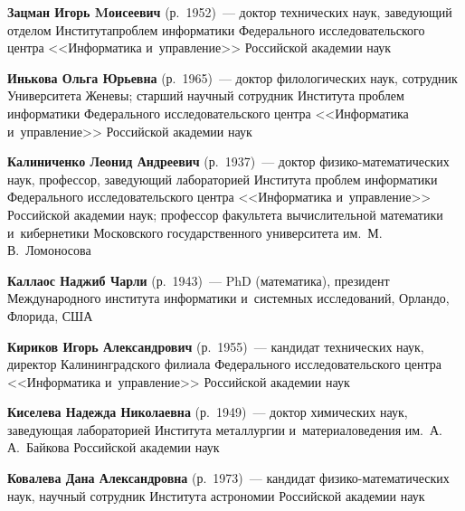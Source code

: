 \begin{multicols}{2}
\vspace*{1pt}

\noindent
\textbf{Зацман Игорь Mоисеевич} (р.\ 1952)~---
доктор тех\-нических наук, заведующий отделом Института\linebreak проб\-лем 
информатики Федерального исследовательского центра <<Информатика и~управ\-ле\-ние>> 
Российской академии наук

\vspace*{1pt}

\noindent
\textbf{Инькова Ольга Юрьевна} (р.\ 1965)~--- доктор фи\-лологических наук, 
сотрудник Университета Же\-невы; старший научный сотрудник Института \mbox{проб\-лем}
информатики Федерального исследовательского центра <<Информатика и~управ\-ление>>
Рос\-сийской академии наук

\columnbreak





\noindent
\textbf{Калиниченко Леонид Андреевич} (р.\ 1937)~---
 доктор фи\-зи\-ко-ма\-те\-ма\-ти\-че\-ских наук, профессор, заведующий 
 лабораторией Института проб\-лем 
информатики Федерального исследовательского центра <<Информатика и~управ\-ление>>
Российской академии наук; 
профессор факультета вычислительной математики и~кибернетики 
Московского государственного университета им.\ М.\,В.~Ломоносова

\vspace*{1pt}

\noindent
\textbf{Каллаос Наджиб Чарли} (р.\ 1943)~--- 
PhD (математика), президент Международного института информатики 
и~системных исследований, Орландо, Флорида, США


\vspace*{1pt}

 \noindent
\textbf{Кириков Игорь Александрович} (р.\ 1955)~---
кандидат технических наук, директор Калининградского филиала Федерального 
исследовательского центра <<Информатика и~управ\-ле\-ние>> Российской академии наук

\vspace*{1pt}

 \noindent
\textbf{Киселева Надежда Николаевна} (р.\ 1949)~---
доктор химических наук, заведующая лабораторией Института металлургии 
и~материаловедения им.\ А.\,А.~Байкова Российской академии наук 

\vspace*{1pt}


 \noindent
\textbf{Ковалева Дана Александровна} (р.\ 1973)~---
кандидат фи\-зи\-ко-ма\-те\-ма\-ти\-че\-ских наук, научный сотрудник Института 
астрономии Российской академии наук 


\end{multicols}
